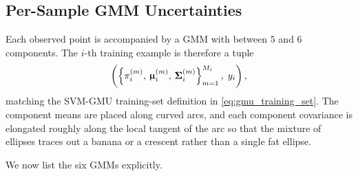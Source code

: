 \documentclass[11pt, letterpaper]{article}
\newcommand{\bSigma}{\vb{\Sigma}}
\newcommand{\bmu}{\boldsymbol{\upmu}}
\begin{document}
\subsection{Per-Sample GMM Uncertainties}\label{sec:exp_close_separable_gmms}

Each observed point is accompanied by a GMM with between $5$ and $6$ components. The $i$-th training example is therefore a tuple
\begin{equation}
    \left(\left\{\pi_i^{(m)},\, \bmu_i^{(m)},\, \bSigma_i^{(m)}\right\}_{m=1}^{M_i},\; y_i\right),
\end{equation}
matching the SVM-GMU training-set definition in \cref{eq:gmu_training_set}. The component means are placed along curved arcs, and each component covariance is elongated roughly along the local tangent of the arc so that the mixture of ellipses traces out a banana or a crescent rather than a single fat ellipse.

We now list the six GMMs explicitly.
\end{document}
